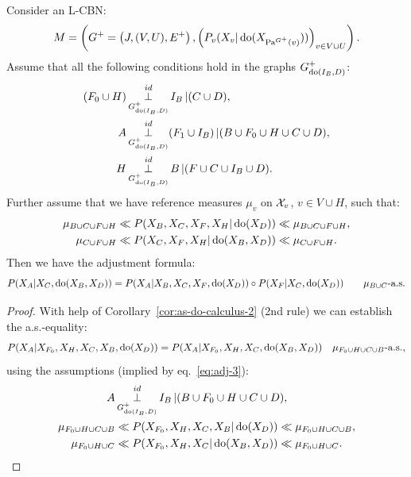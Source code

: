 \begin{Thm}
    \label{thm-gen-adjustment}
Consider an L-CBN:
        \[M= \left ( G^+=\left ( J,(V,U),E^+ \right ), \left ( P_v ( X_v|\operatorname{do}( X_{\mathrm{Pa}^{G^+}(v)})) \right )_{v \in V \cup U} \right ).\]
    Assume that all the following conditions hold in the graphs $G^+_{\operatorname{do}(I_B,D)}$: 
    \begin{align}
        (F_0 \cup H) & \operatorname*{\perp}^{id}_{G^+_{\operatorname{do}(I_B,D)}} I_B \operatorname*{|} (C \cup D), \label{eq:adj-1} \\
        A & \operatorname*{\perp}^{id}_{G^+_{\operatorname{do}(I_B,D)}} (F_1 \cup I_B) \operatorname*{|} (B \cup F_0 \cup H \cup C \cup D),\label{eq:adj-3} \\
       H &\operatorname*{\perp}^{id}_{G^+_{\operatorname{do}(I_B,D)}} B \operatorname*{|} (F \cup C \cup  I_B \cup D). \label{eq:adj-5} 
   \end{align}
   Further assume that we have reference measures $\mu_v$ on $\mathcal{X}_v$, $v \in V \cup H$, such that:
  \begin{align*}
      \mu_{B \cup C \cup F \cup H} &\ll  P(X_B,X_C,X_F,X_H|\operatorname{do}(X_D)) \ll \mu_{B \cup C \cup F \cup H},\\
      \mu_{C \cup F \cup H} &\ll  P(X_C,X_F,X_H|\operatorname{do}(X_B,X_D)) \ll \mu_{C \cup F \cup H}.
  \end{align*}
    Then we have the adjustment formula: 
    \[ P(X_A|X_C,\operatorname{do}(X_B,X_D)) = P(X_A|X_B,X_C,X_F,\operatorname{do}(X_D)) \circ P(X_F|X_C,\operatorname{do}(X_D)) \qquad  \mu_{B \cup C}\text{-a.s.} \]
\begin{proof}
      
With help of Corollary~\ref{cor:as-do-calculus-2} (2nd rule) we can establish the a.s.-equality:
    \begin{align}
        P(X_A|X_{F_0},X_H,X_C,X_B,\operatorname{do}(X_D)) &= P(X_A|X_{F_0},X_H,X_C,\operatorname{do}(X_B,X_D)) &\mu_{F_0 \cup H \cup C \cup B} \text{-a.s.,} \label{eq:adj-eq-6}
    \end{align}
    using the assumptions (implied by eq.\ \ref{eq:adj-3}):
\begin{align*}
    A & \operatorname*{\perp}^{id}_{G^+_{\operatorname{do}(I_B,D)}} I_B \operatorname*{|} (B \cup F_0 \cup H \cup C \cup D),\\
\mu_{F_0 \cup H \cup C \cup B} & \ll P(X_{F_0},X_H,X_C,X_B|\operatorname{do}(X_D)) \ll \mu_{F_0 \cup H \cup C \cup B},\\
\mu_{F_0 \cup H \cup C} & \ll P(X_{F_0},X_H,X_C|\operatorname{do}(X_B,X_D)) \ll \mu_{F_0 \cup H \cup C}.
\end{align*}


\end{proof}
\end{Thm}
